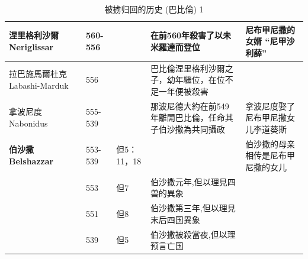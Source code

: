 \begin{table}[!hbp]
\begin{tabular}{|p{}|p{1.5cm}|p{2.5cm}|p{6.2cm}|p{2.5cm}|}
涅里格利沙爾 Neriglissar & 560-556 & &在前560年殺害了以未米羅達而登位 & 尼布甲尼撒的女婿\cite{Neriglissar} “尼甲沙利薛”\cite{尼甲沙利薛}\\\hline
拉巴施馬爾杜克 Labashi-Marduk&  556& & 巴比倫涅里格利沙爾之子，幼年繼位，在位不足一年便被殺害\cite{Labashi-Marduk}&\\\hline
拿波尼度 Nabonidus&	555-539&	&那波尼德大約在前549年離開巴比倫，任命其子伯沙撒為共同攝政\cite{Nabonidus}& 拿波尼度娶了尼布甲尼撒女儿李道葵斯\cite{尼甲沙利薛}\\\hline
\textbf{伯沙撒	Belshazzar}&553-539&	但5：11，18& & 伯沙撒的母亲相传是尼布甲尼撒的女儿\cite{尼甲沙利薛}\\\hline	

&553&但7& 伯沙撒元年,但以理見四兽的異象& \\\hline	
	&551\cite{伯沙撒}&但8&伯沙撒第三年,但以理見末后四国異象& \\\hline
		&539  &	 	 但5& 伯沙撒被殺當夜,但以理预言亡国& \\\hline	
\end{tabular}
\caption{被掳归回的历史 (巴比倫) 1}
\end{table}

 
